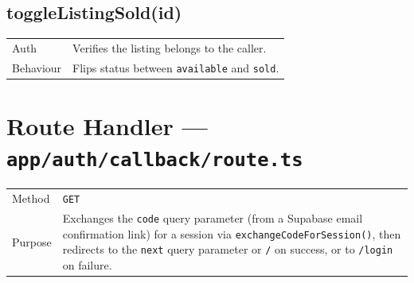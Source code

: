 \documentclass[11pt,a4paper]{article}
\makeatletter
\newcommand{\actiontable}[1]{%
  \begin{tabular}{@{}p{2.6cm}p{10.9cm}@{}}
  #1
  \end{tabular}
}
\makeatother
\begin{document}
\subsection{toggleListingSold(id)}
\actiontable{
Auth & Verifies the listing belongs to the caller. \\
Behaviour & Flips status between \texttt{available} and \texttt{sold}. \\
}

\section{Route Handler --- \texttt{app/auth/callback/route.ts}}
\actiontable{
Method & \texttt{GET} \\
Purpose & Exchanges the \texttt{code} query parameter (from a Supabase email
  confirmation link) for a session via \texttt{exchangeCodeForSession()}, then redirects
  to the \texttt{next} query parameter or \texttt{/} on success, or to \texttt{/login}
  on failure. \\
}
\end{document}
